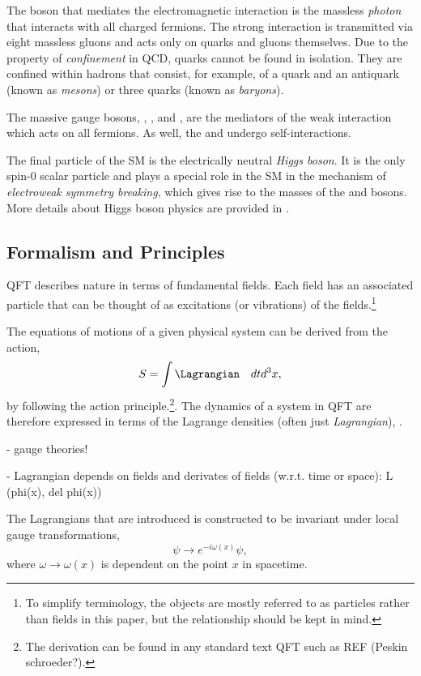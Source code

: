 The boson that mediates the electromagnetic interaction is the massless \emph{photon} that interacts with all charged fermions. 
The strong interaction is transmitted via eight massless gluons and acts only on quarks and gluons themselves. 
Due to the property of \emph{confinement} in QCD, quarks cannot be found in isolation. They are confined within hadrons that consist, for example, of a quark and an antiquark (known as \emph{mesons}) or three quarks (known as \emph{baryons}). 

The massive gauge bosons, \Wplus, \Wminus, and \Zboson, are the mediators of the weak interaction which acts on all fermions. As well, the \Wmp and \Zboson undergo self-interactions. 

The final particle of the SM is the electrically neutral \emph{Higgs boson}. It is the only spin-0 scalar particle and plays a special role in the SM in the mechanism of \emph{electroweak symmetry breaking}, which gives rise to the masses of the \Wpm and \Zboson bosons. More details about Higgs boson physics are provided in .


\subsection{Formalism and Principles} 
QFT describes nature in terms of fundamental fields. Each field has an associated particle that can be thought of as excitations (or vibrations) of the fields.\footnote{To simplify terminology, the objects are mostly referred to as particles rather than fields in this paper, but the relationship should be kept in mind.}

The equations of motions of a given physical system can be derived from the action, 
\begin{equation}
    \label{eq:action}
    S = \int \Lagrangian \quad dt d^3x, 
\end{equation}
by following the action principle.\footnote{The derivation can be found in any standard text QFT such as REF (Peskin schroeder?).}.
The dynamics of a system in QFT are therefore expressed in terms of the Lagrange densities (often just \emph{Lagrangian}), \Lagrangian. 

- gauge theories!

- Lagrangian depends on fields and derivates of fields (w.r.t. time or space): L (phi(x), del phi(x))

The Lagrangians that are introduced is constructed to be invariant under local gauge transformations, 
\begin{equation}
  \psi \rightarrow e^{-i\omega(x)} \psi,
\end{equation}
where $\omega \rightarrow \omega(x)$ is dependent on the point $x$ in spacetime. 


